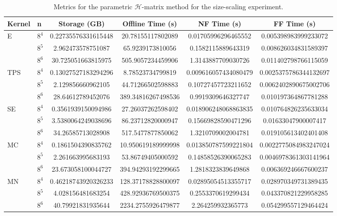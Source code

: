 \documentclass[final,3p,times]{elsarticle}
\newcommand{\mc}[1]{\mathcal{#1}}
\begin{document}
\begin{table}[!ht]
\centering
\scriptsize
\begin{tabular}{llSSSS}
\hline 
\textbf{Kernel} & \textbf{n} & \textbf{Storage (GB)} & \textbf{Offline Time (s)} & \textbf{NF Time (s)} & \textbf{FF Time (s)} \\
\hline 
        E & $8^4$ & 0.22735576331615448 & 20.78155117802089 & 0.01705996296465552 & 0.005398983999233072 \\ 
         & $8^5$ & 2.962473578751087 & 65.9239173810056 & 0.1582115889643319 & 0.008626034831589397 \\ 
         & $8^6$ & 30.725051663815975 & 505.9057234459906 & 1.3143887709030726 & 0.011402798766115059 \\ \hline
        TPS & $8^4$ & 0.13027527183294296 & 8.78523734799819 & 0.009616057434080479 & 0.0025375786344132697 \\ 
         & $8^5$ & 2.129856660962105 & 44.71266502598883 & 0.10727457723211652 & 0.0062402890675002706 \\ 
         & $8^6$ & 28.64612789452076 & 389.34816267498536 & 0.9919309646327747 & 0.010197364867781288 \\ \hline
        SE & $8^4$ & 0.3561939150094986 & 27.26037262598402 & 0.018906248068863835 & 0.010764826235633034 \\ 
         & $8^5$ & 3.5380064249038696 & 86.23712820000947 & 0.15669828590471296 & 0.01633047900007417 \\ 
         & $8^6$ & 34.26585713028908 & 517.5477877850062 & 1.3210709002004781 & 0.019105613402401408 \\ \hline
        MC & $8^4$ & 0.1861504390835762 & 10.950619189999998 & 0.013850787599221804 & 0.0022775084983247024 \\ 
         & $8^5$ & 2.261663995683193 & 53.86749405000592 & 0.14858526390065283 & 0.0046978361303141964 \\ 
         & $8^6$ & 23.673058100044727 & 394.94293192299665 & 1.2818323839649868 & 0.006369246667600237 \\ \hline
        MN & $8^4$ & 0.46218743920326233 & 128.37178828800097 & 0.02895054513355717 & 0.028970349731389435 \\ 
         & $8^5$ & 4.028156481683254 & 428.92936769500375 & 0.2553370619299434 & 0.043370821229958285 \\ 
         & $8^6$ & 40.79921831935644 & 2234.2755926479877 & 2.264259932365773 & 0.054299557129464424 \\ \hline
\end{tabular}
\caption{Metrics for the parametric $\mc{H}$-matrix method for the size-scaling experiment.}
\label{tab:ph_matrix_method}
\end{table}
\end{document}
